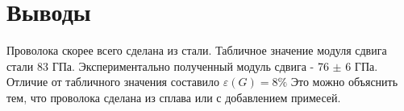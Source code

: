 \documentclass[a4paper,14pt]{extarticle}
\begin{document}
	\section{Выводы}
	Проволока скорее всего сделана из стали. Табличное значение модуля сдвига стали 83 ГПа. Экспериментально полученный модуль сдвига - 76 $\pm$ 6 ГПа. Отличие от табличного значения составило $\varepsilon(G) = 8\%$
	Это можно объяснить тем, что проволока сделана из сплава или с добавлением примесей.
\end{document}
